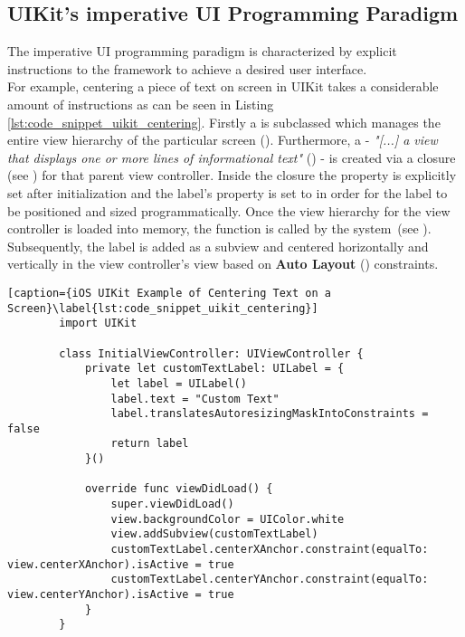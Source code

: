 \subsection{UIKit's imperative UI Programming Paradigm}
The imperative UI programming paradigm is characterized by explicit instructions to the framework to achieve a desired user interface.\\
For example, centering a piece of text on screen in UIKit takes a considerable amount of instructions as can be seen in Listing \ref{lst:code_snippet_uikit_centering}.
Firstly a  is subclassed which manages the entire view hierarchy of the particular screen (\cite{UIViewControllerDocumentation2021}). 
Furthermore, a  - \textit{"[...] a view that displays one or more lines of informational text"} (\textcite{UILabelDocumentation2021}) - is created via a closure (see \cite{ClosureDocumentation2021}) for that parent view controller.
Inside the closure the  property is explicitly set after initialization and the label's  property is set to  in order for the label to be positioned and sized programmatically.
Once the view hierarchy for the view controller is loaded into memory, the  function is called by the system (see \cite{viewDidLoadDocumentation2021}).
Subsequently, the label is added as a subview and centered horizontally and vertically in the view controller's view based on \textbf{Auto Layout} (\cite{AutoLayoutDocumentation2016}) constraints.\\

\begin{minipage}{\linewidth}
    \begin{lstlisting}[caption={iOS UIKit Example of Centering Text on a Screen}\label{lst:code_snippet_uikit_centering}]
        import UIKit
    
        class InitialViewController: UIViewController {
            private let customTextLabel: UILabel = {
                let label = UILabel()
                label.text = "Custom Text"
                label.translatesAutoresizingMaskIntoConstraints = false
                return label
            }()
    
            override func viewDidLoad() {
                super.viewDidLoad()
                view.backgroundColor = UIColor.white
                view.addSubview(customTextLabel)
                customTextLabel.centerXAnchor.constraint(equalTo: view.centerXAnchor).isActive = true
                customTextLabel.centerYAnchor.constraint(equalTo: view.centerYAnchor).isActive = true
            }
        }
    \end{lstlisting}
\end{minipage}

